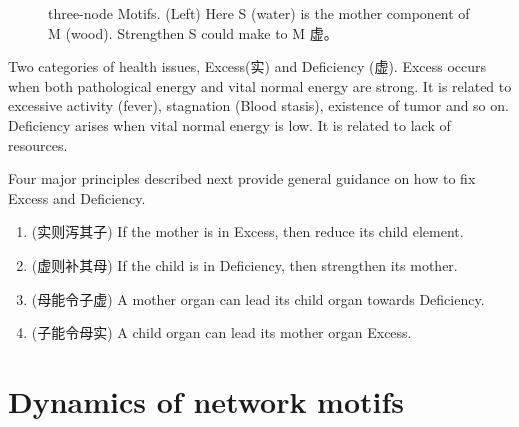 \documentclass{article}
\begin{document}
\begin{figure}[!htb]
\centering
 \begin{minipage}{0.3\textwidth}
\end{minipage}
 \begin{minipage}{0.3\textwidth}
\end{minipage}
\caption{three-node Motifs. (Left) Here S (water) is the mother component of M (wood). Strengthen S could make  to M 虚。 }
\label{F:Motifs}
\end{figure}


Two categories of health issues, Excess(实) and  Deficiency (虚). Excess occurs when both pathological energy and   vital normal energy are  strong. It is related to excessive activity (fever), stagnation (Blood stasis), existence of tumor and so on. 
Deficiency arises when vital normal energy is low. It is related to lack of resources. 

Four major principles described next provide general guidance on how to fix Excess and Deficiency.  

\begin{enumerate}
    \item (实则泻其子) If the mother is in  Excess, then reduce  its child element. 
    \item (虚则补其母) If the child is in Deficiency, then strengthen its mother.
    \item (母能令子虚) A mother organ can lead  its child organ towards Deficiency. \cite{nanJing} 
    \item (子能令母实) A child organ can lead its mother organ Excess. 
\cite{nanJing}
    
\end{enumerate}


\section{Dynamics of network motifs}
\end{document}
